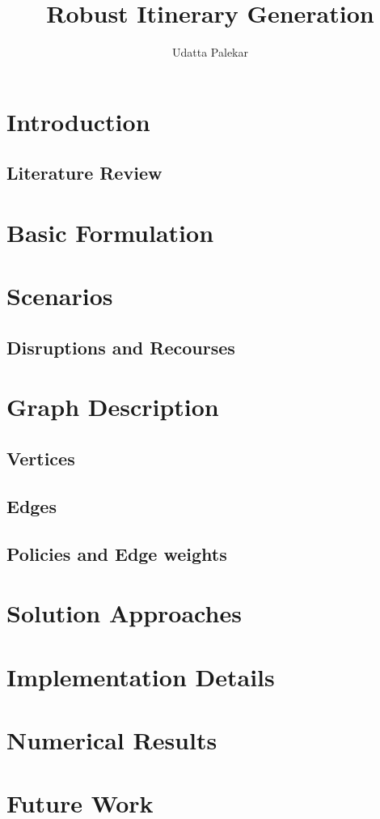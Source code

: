 \documentclass[tikz,border=10pt,10pt]{article}
\title{Robust Itinerary Generation}
\author[1]{Udatta Palekar}
\begin{document}
\maketitle
	\section{Introduction}
	
		\subsection{Literature Review}
		
	\section{Basic Formulation}
	
	\section{Scenarios}
	
		\subsection{Disruptions and Recourses}
		
	\section{Graph Description}
	
		\subsection{Vertices}
		
		\subsection{Edges}
		
		\subsection{Policies and Edge weights}
		
	\section{Solution Approaches}
	
	\section{Implementation Details}
	
	\section{Numerical Results}
	
	\section{Future Work}
	
\end{document}
